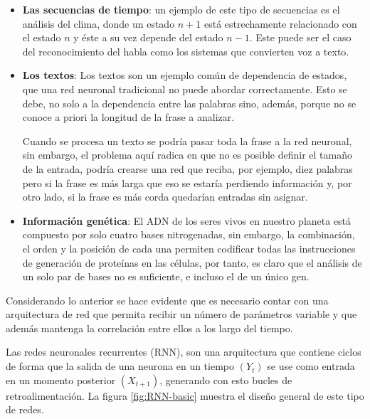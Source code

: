         \begin{itemize}
            \item \textbf{Las secuencias de tiempo}: un ejemplo de este tipo de secuencias es el análisis del clima, donde un estado $n+1$ está estrechamente relacionado con el estado $n$ y éste a su vez depende del estado $n-1$. Este puede ser el caso del reconocimiento del habla como los sistemas que convierten voz a texto.
            
            \item \textbf{Los textos}: Los textos son un ejemplo común de dependencia de estados, que una red neuronal tradicional no puede abordar correctamente. Esto se debe, no solo a la dependencia entre las palabras sino, además, porque no se conoce a priori la longitud de la frase a analizar. 
            
            Cuando se procesa un texto se podría pasar toda la frase a la red neuronal, sin embargo, el problema aquí radica en que no es posible definir el tamaño de la entrada, podría crearse una red que reciba, por ejemplo, diez palabras pero si la frase es más larga que eso se estaría perdiendo información y, por otro lado, si la frase es más corda quedarían entradas sin asignar.
            
            \item \textbf{Información genética}: El ADN de los seres vivos en nuestro planeta está compuesto por solo cuatro bases nitrogenadas, sin embargo, la combinación, el orden y la posición de cada una permiten codificar todas las instrucciones de generación de proteínas en las células, por tanto, es claro que el análisis de un solo par de bases no es suficiente, e incluso el de un único gen.
            
        \end{itemize}
        
        Considerando lo anterior se hace evidente que es necesario contar con una arquitectura de red que permita recibir un número de parámetros variable y que además mantenga la correlación entre ellos a los largo del tiempo.
        
        Las redes neuronales recurrentes (RNN), son una arquitectura que contiene ciclos de forma que la salida de una neurona en un tiempo $(Y_t)$ se use como entrada en un momento posterior $(X_{t+1})$, generando con esto bucles de retroalimentación. La figura \ref{fig:RNN-basic} muestra el diseño general de este tipo de redes.
            

